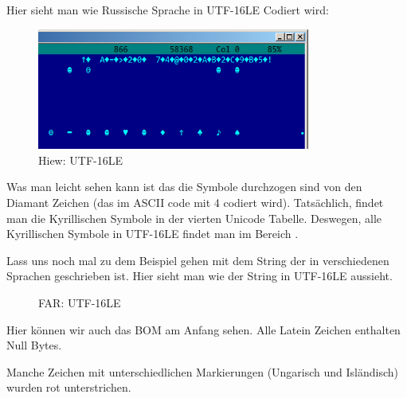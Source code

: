Hier sieht man wie Russische Sprache in UTF-16LE Codiert wird:

\begin{figure}[H]
\centering
\includegraphics[width=0.8\textwidth]{digging_into_code/strings/russian_UTF16.png}
\caption{Hiew: UTF-16LE}
\end{figure}

Was man leicht sehen kann ist das die Symbole durchzogen sind von den Diamant Zeichen (das im ASCII code mit 4 codiert wird).
Tats\"achlich, findet man die Kyrillischen Symbole in der vierten Unicode Tabelle.
Deswegen, alle Kyrillischen Symbole in UTF-16LE findet man im Bereich .

Lass uns noch mal zu dem Beispiel gehen mit dem String der in verschiedenen Sprachen geschrieben ist.
Hier sieht man wie der String in UTF-16LE aussieht. 

\begin{figure}[H]
\centering
{}
\caption{FAR: UTF-16LE}
\end{figure}

Hier k\"onnen wir auch das \ac{BOM} am Anfang sehen. 
Alle Latein Zeichen enthalten Null Bytes.

Manche Zeichen mit unterschiedlichen Markierungen (Ungarisch und Isl\"andisch) wurden rot unterstrichen.



